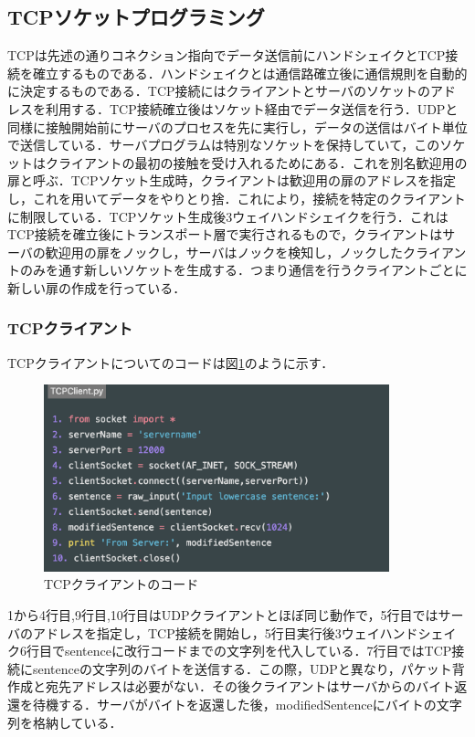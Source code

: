 \documentclass[9pt,a4j,twocolumn]{jsarticle}
\begin{document}
\subsection{TCPソケットプログラミング}
TCPは先述の通りコネクション指向でデータ送信前にハンドシェイクとTCP接続を確立するものである．ハンドシェイクとは通信路確立後に通信規則を自動的に決定するものである．TCP接続にはクライアントとサーバのソケットのアドレスを利用する．TCP接続確立後はソケット経由でデータ送信を行う．UDPと同様に接触開始前にサーバのプロセスを先に実行し，データの送信はバイト単位で送信している．サーバプログラムは特別なソケットを保持していて，このソケットはクライアントの最初の接触を受け入れるためにある．これを別名歓迎用の扉と呼ぶ．TCPソケット生成時，クライアントは歓迎用の扉のアドレスを指定し，これを用いてデータをやりとり捨．これにより，接続を特定のクライアントに制限している．TCPソケット生成後3ウェイハンドシェイクを行う．これはTCP接続を確立後にトランスポート層で実行されるもので，クライアントはサーバの歓迎用の扉をノックし，サーバはノックを検知し，ノックしたクライアントのみを通す新しいソケットを生成する．つまり通信を行うクライアントごとに新しい扉の作成を行っている．\\

\subsubsection{TCPクライアント}
TCPクライアントについてのコードは図\ref{fig:tcp_client}のように示す．
\begin{figure}[tb]
\includegraphics[width=10cm]{TCPClient.png}
 \caption{TCPクライアントのコード}
 \label{fig:tcp_client}
\end{figure}
1から4行目,9行目,10行目はUDPクライアントとほぼ同じ動作で，5行目ではサーバのアドレスを指定し，TCP接続を開始し，5行目実行後3ウェイハンドシェイク6行目でsentenceに改行コードまでの文字列を代入している．7行目ではTCP接続にsentenceの文字列のバイトを送信する．この際，UDPと異なり，パケット背作成と宛先アドレスは必要がない．その後クライアントはサーバからのバイト返還を待機する．サーバがバイトを返還した後，modifiedSentenceにバイトの文字列を格納している．\\
\end{document}
